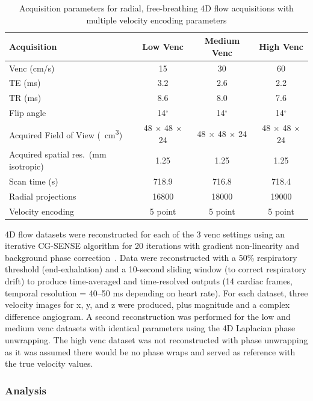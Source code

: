 \begin{table}[ht]
    \centering
    \caption[Study acquisition parameters]{Acquisition parameters for radial, free-breathing 4D flow acquisitions with multiple velocity encoding parameters}\label{tab:gevenc_params}
    \small
    \ifFinal{}
    \fi
    \vspace{0.25cm}
    \begin{tabular}{lccc}
    \toprule
    \textbf{Acquisition} & \textbf{Low Venc} & \textbf{Medium Venc} & \textbf{High Venc} \\
    \toprule
    Venc (cm/s) & 15 & 30 & 60 \\
    TE (ms) & 3.2 & 2.6 & 2.2 \\
    TR (ms) & 8.6 & 8.0 & 7.6 \\
    Flip angle & 14$^\circ$ & 14$^\circ$ & 14$^\circ$ \\
    Acquired Field of View (\qty{}{cm^3}) & 48 $\times$ 48 $\times$ 24 & 48 $\times$ 48 $\times$ 24 & 48 $\times$ 48 $\times$ 24 \\
    Acquired spatial res.\ (mm isotropic) & 1.25 & 1.25 & 1.25 \\
    Scan time (s) & 718.9 & 716.8 & 718.4 \\
    Radial projections & 16800 & 18000 & 19000 \\
    Velocity encoding & 5 point & 5 point & 5 point \\
    \bottomrule
    \end{tabular}
\end{table}

4D flow datasets were reconstructed for each of the 3 venc settings using an iterative CG-SENSE algorithm for 20 iterations with gradient non-linearity and background phase correction~\cite{pruessmann2001}. Data were reconstructed with a 50\% respiratory threshold (end-exhalation) and a 10-second sliding window (to correct respiratory drift) to produce time-averaged and time-resolved outputs (14 cardiac frames, temporal resolution = 40--50 ms depending on heart rate). For each dataset, three velocity images for x, y, and z were produced, plus magnitude and a complex difference angiogram. A second reconstruction was performed for the low and medium venc datasets with identical parameters using the 4D Laplacian phase unwrapping. The high venc dataset was not reconstructed with phase unwrapping as it was assumed there would be no phase wraps and served as reference with the true velocity values.

\subsubsection{Analysis}

